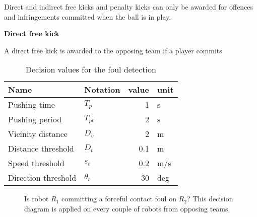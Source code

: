 \clearpage
\sffamily
{\bfseries\color[rgb]{0.4,0.4,0.4}{Law 12 -- Fouls and Misconduct} }
{}

\bigskip

Direct and indirect free kicks and penalty kicks can only be awarded for
offences and infringements committed when the ball is in play.

\bigskip

{\bfseries Direct free kick }

\headlinebox

A direct free kick is awarded to the opposing team if a player commits

\begin{table}[h]
  \caption{\label{tab:forceful_contact}Decision values for the foul detection}
  \centering
  \begin{tabular}{|l l r l|}
    \hline
    Name & Notation & value & unit\\
    \hline
    Pushing time & $T_p$ & 1 & s\\
    Pushing period & $T_{pt}$ & 2 & s\\
    Vicinity distance & $D_v$ & 2 & m\\
    Distance threshold & $D_t$ & 0.1 & m\\
    Speed threshold & $s_t$ & 0.2 & m/s\\
    Direction threshold & $\theta_t$ & 30 & deg\\
    \hline
  \end{tabular}
\end{table}

\begin{figure}[h]
  \centering
  
  \caption{\label{fig:forceful_contact}
    Is robot $R_1$ committing a forceful contact foul on $R_2$?
    This decision diagram is applied on every couple of robots from opposing
    teams.}
\end{figure}


